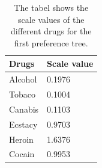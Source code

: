 % 
\begin{table}[H]
	\centering
	\begin{tabular}{@{}ll@{}}
		\toprule
		Drugs     & Scale value \\ \midrule
		Alcohol	  & 0.1976   \\
		Tobaco	  & 0.1004   \\
		Canabis	  & 0.1103   \\
		Ecstacy	  & 0.9703   \\
		Heroin	  & 1.6376   \\
		Cocain	  & 0.9953   \\	\bottomrule
	\end{tabular}
	\caption{The tabel shows the scale values of the different drugs for the first preference tree.}
	\label{tab:ScaleValues1}
\end{table} 
\noindent 
%

